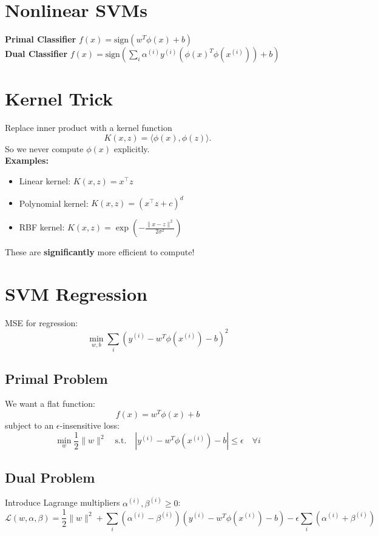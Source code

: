 \documentclass[11pt]{article}
\begin{document}
\pagebreak
\section*{Nonlinear SVMs}
\textbf{Primal Classifier} \(f(x) = \text{sign}(w^T \phi (x) + b)\) \\ 
\textbf{Dual Classifier} \(f(x) = \text{sign}\left( \sum_i \alpha^{(i)} y^{(i)} (\phi{(x)^T\phi{(x^{(i)})}}) + b \right)\) \\

\section*{Kernel Trick}

Replace inner product with a kernel function
\[
K(x,z) = \langle \phi(x), \phi(z)\rangle.
\]
So we never compute $\phi(x)$ explicitly. \\

\textbf{Examples:}
\begin{itemize}
    \item Linear kernel: $K(x,z) = x^\top z$
    \item Polynomial kernel: $K(x,z) = (x^\top z + c)^d$
    \item RBF kernel: $K(x,z) = \exp\!\left(-\tfrac{\|x-z\|^2}{2\sigma^2}\right)$
\end{itemize}
These are \textbf{significantly} more efficient to compute!

\pagebreak

\section*{SVM Regression}
MSE for regression:
\[
\min_{w,b} \sum_i (y^{(i)} - w^T \phi{(x^{(i)})} - b)^2
\]

\subsection*{Primal Problem}
We want a flat function:
\[
f(x) = w^T \phi(x) + b
\]
subject to an $\epsilon$-insensitive loss:
\[
\min_{w} \frac{1}{2}\|w\|^2
\quad \text{s.t.} \quad |y^{(i)} - w^T \phi(x^{(i)}) - b| \leq \epsilon \quad \forall i
\]


\subsection*{Dual Problem}
Introduce Lagrange multipliers $\alpha^{(i)}, \beta^{(i)} \geq 0$:
\[
\mathcal{L}(w,\alpha,\beta) 
= \frac{1}{2}\|w\|^2 
+ \sum_i (\alpha^{(i)} - \beta^{(i)})(y^{(i)} - w^T\phi(x^{(i)}) - b) 
- \epsilon \sum_i (\alpha^{(i)} + \beta^{(i)})
\]
\end{document}
